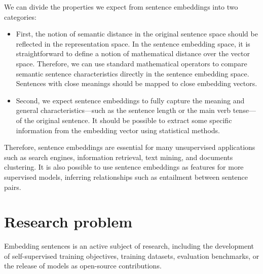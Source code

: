 We can divide the properties we expect from sentence embeddings into two categories:
\begin{itemize}
    \item First, the notion of semantic distance in the original sentence space should be reflected in the representation space. In the sentence embedding space, it is straightforward to define a notion of mathematical distance over the vector space. Therefore, we can use standard mathematical operators to compare semantic sentence characteristics directly in the sentence embedding space. Sentences with close meanings should be mapped to close embedding vectors.
    \item Second, we expect sentence embeddings to fully capture the meaning and general characteristics—such as the sentence length or the main verb tense—of the original sentence. It should be possible to extract some specific information from the embedding vector using statistical methods. 
\end{itemize}
Therefore, sentence embeddings are essential for many unsupervised applications such as search engines, information retrieval, text mining, and documents clustering. It is also possible to use sentence embeddings as features for more supervised models, inferring relationships such as entailment between sentence pairs. 


\section{Research problem}

Embedding sentences is an active subject of research, including the development of self-supervised training objectives, training datasets, evaluation benchmarks, or the release of models as open-source contributions.

